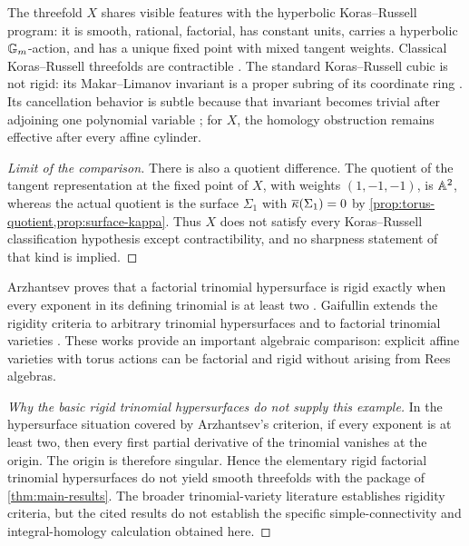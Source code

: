 \begin{historicalnote}\label{hist:koras-russell-comparison}
The threefold $X$ shares visible features with the hyperbolic Koras--Russell program: it is smooth, rational, factorial, has constant units, carries a hyperbolic $\mathbb G_m$-action, and has a unique fixed point with mixed tangent weights.  Classical Koras--Russell threefolds are contractible \cite{KalimanMakarLimanov1997}.  The standard Koras--Russell cubic is not rigid: its Makar--Limanov invariant is a proper subring of its coordinate ring \cite{MakarLimanov1996}.  Its cancellation behavior is subtle because that invariant becomes trivial after adjoining one polynomial variable \cite{Dubouloz2009}; for $X$, the homology obstruction remains effective after every affine cylinder.
\end{historicalnote}

\begin{proof}[Limit of the comparison]
There is also a quotient difference.  The quotient of the tangent representation at the fixed point of $X$, with weights $(1,-1,-1)$, is $\mathbb A^2$, whereas the actual quotient is the surface $\Sigma_1$ with $\overline\kappa(\Sigma_1)=0$ by \cref{prop:torus-quotient,prop:surface-kappa}.  Thus $X$ does not satisfy every Koras--Russell classification hypothesis except contractibility, and no sharpness statement of that kind is implied.
\end{proof}

\begin{historicalnote}\label{hist:trinomial-comparison}
Arzhantsev proves that a factorial trinomial hypersurface is rigid exactly when every exponent in its defining trinomial is at least two \cite{Arzhantsev2016}.  Gaifullin extends the rigidity criteria to arbitrary trinomial hypersurfaces and to factorial trinomial varieties \cite{Gaifullin2019}.  These works provide an important algebraic comparison: explicit affine varieties with torus actions can be factorial and rigid without arising from Rees algebras.
\end{historicalnote}

\begin{proof}[Why the basic rigid trinomial hypersurfaces do not supply this example]
In the hypersurface situation covered by Arzhantsev's criterion, if every exponent is at least two, then every first partial derivative of the trinomial vanishes at the origin.  The origin is therefore singular.  Hence the elementary rigid factorial trinomial hypersurfaces do not yield smooth threefolds with the package of \cref{thm:main-results}.  The broader trinomial-variety literature establishes rigidity criteria, but the cited results do not establish the specific simple-connectivity and integral-homology calculation obtained here.
\end{proof}

